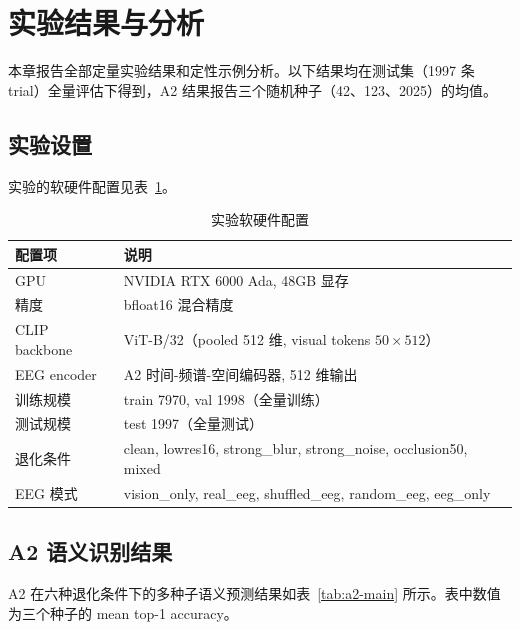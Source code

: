 \section{实验结果与分析}

本章报告全部定量实验结果和定性示例分析。以下结果均在测试集（1997 条 trial）全量评估下得到，A2 结果报告三个随机种子（42、123、2025）的均值。

\subsection{实验设置}

实验的软硬件配置见表~\ref{tab:exp-setup}。

\begin{table}[htbp]
  \centering
  \caption{实验软硬件配置}
  \label{tab:exp-setup}
  \begin{tabular}{l l}
    \toprule
    配置项 & 说明 \\
    \midrule
    GPU & NVIDIA RTX 6000 Ada, 48GB 显存 \\
    精度 & bfloat16 混合精度 \\
    CLIP backbone & ViT-B/32（pooled 512 维, visual tokens $50\times512$）\\
    EEG encoder & A2 时间-频谱-空间编码器, 512 维输出 \\
    训练规模 & train 7970, val 1998（全量训练）\\
    测试规模 & test 1997（全量测试）\\
    退化条件 & clean, lowres16, strong\_blur, strong\_noise, occlusion50, mixed \\
    EEG 模式 & vision\_only, real\_eeg, shuffled\_eeg, random\_eeg, eeg\_only \\
    \bottomrule
  \end{tabular}
\end{table}

\subsection{A2 语义识别结果}

A2 在六种退化条件下的多种子语义预测结果如表~\ref{tab:a2-main} 所示。表中数值为三个种子的 mean top-1 accuracy。

